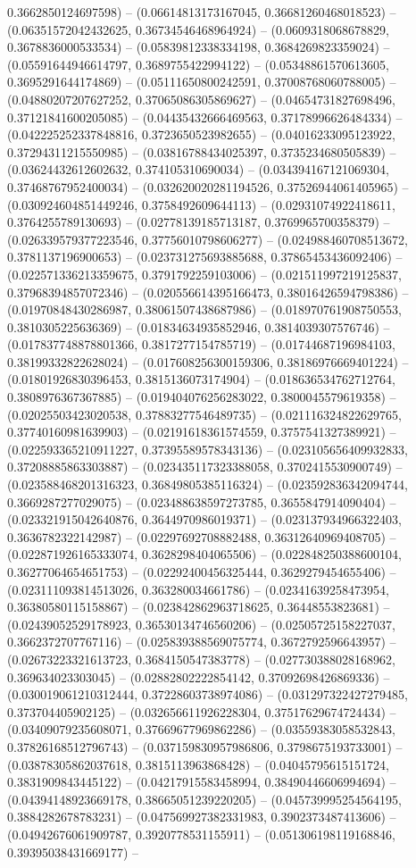 0.3662850124697598) -- (0.06614813173167045, 0.36681260468018523) -- (0.06351572042432625, 0.36734546468964924) -- (0.0609318068678829, 0.3678836000533534) -- (0.05839812338334198, 0.3684269823359024) -- (0.05591644946614797, 0.3689755422994122) -- (0.05348861570613605, 0.3695291644174869) -- (0.05111650800242591, 0.37008768060788005) -- (0.04880207207627252, 0.37065086305869627) -- (0.04654731827698496, 0.37121841600205085) -- (0.04435432666469563, 0.37178996626484334) -- (0.042225252337848816, 0.3723650523982655) -- (0.04016233095123922, 0.37294311215550985) -- (0.03816788434025397, 0.3735234680505839) -- (0.03624432612602632, 0.374105310690034) -- (0.034394167121069304, 0.37468767952400034) -- (0.032620020281194526, 0.37526944061405965) -- (0.030924604851449246, 0.3758492609644113) -- (0.02931074922418611, 0.3764255789130693) -- (0.02778139185713187, 0.3769965700358379) -- (0.026339579377223546, 0.37756010798606277) -- (0.024988460708513672, 0.3781137196900653) -- (0.023731275693885688, 0.37865453436092406) -- (0.022571336213359675, 0.3791792259103006) -- (0.021511997219125837, 0.37968394857072346) -- (0.020556614395166473, 0.38016426594798386) -- (0.01970848430286987, 0.38061507438687986) -- (0.018970761908750553, 0.3810305225636369) -- (0.01834634935852946, 0.3814039307576746) -- (0.017837748878801366, 0.3817277154785719) -- (0.01744687196984103, 0.38199332822628024) -- (0.017608256300159306, 0.38186976669401224) -- (0.01801926830396453, 0.3815136073174904) -- (0.018636534762712764, 0.3808976367367885) -- (0.019404076256283022, 0.3800045579619358) -- (0.02025503423020538, 0.37883277546489735) -- (0.021116324822629765, 0.37740160981639903) -- (0.02191618361574559, 0.3757541327389921) -- (0.022593365210911227, 0.37395589578343136) -- (0.023105656409932833, 0.37208885863303887) -- (0.023435117323388058, 0.3702415530900749) -- (0.023588468201316323, 0.36849805385116324) -- (0.023592836342094744, 0.3669287277029075) -- (0.023488638597273785, 0.3655847914090404) -- (0.023321915042640876, 0.3644970986019371) -- (0.023137934966322403, 0.3636782322142987) -- (0.02297692708882488, 0.36312640969408705) -- (0.022871926165333074, 0.3628298404065506) -- (0.022848250388600104, 0.36277064654651753) -- (0.02292400456325444, 0.3629279454655406) -- (0.023111093814513026, 0.363280034661786) -- (0.02341639258473954, 0.36380580115158867) -- (0.023842862963718625, 0.36448553823681) -- (0.02439052529178923, 0.36530134746560206) -- (0.02505725158227037, 0.3662372707767116) -- (0.025839388569075774, 0.3672792596643957) -- (0.02673223321613723, 0.3684150547383778) -- (0.027730388028168962, 0.369634023303045) -- (0.02882802222854142, 0.37092698426869336) -- (0.030019061210312444, 0.37228603738974086) -- (0.031297322427279485, 0.373704405902125) -- (0.032656611926228304, 0.37517629674724434) -- (0.03409079235608071, 0.37669677969862286) -- (0.03559383058532843, 0.37826168512796743) -- (0.037159830957986806, 0.3798675193733001) -- (0.03878305862037618, 0.3815113963868428) -- (0.04045795615151724, 0.3831909843445122) -- (0.04217915583458994, 0.38490446606994694) -- (0.04394148923669178, 0.38665051239220205) -- (0.045739995254564195, 0.3884282678783231) -- (0.047569927382331983, 0.3902373487413606) -- (0.04942676061909787, 0.3920778531155911) -- (0.051306198119168846, 0.39395038431669177) -- 